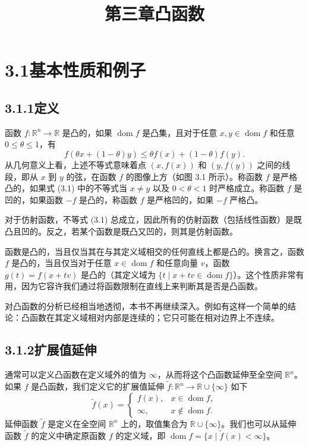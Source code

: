 \documentclass[UTF8,12pt,a4paper,fontset=fandol]{ctexart}
\title{第三章\quad 凸函数}
\author{}
\date{}
\DeclareMathOperator{\dom}{dom}
\begin{document}
\maketitle

\section*{3.1\quad 基本性质和例子}

\subsection*{3.1.1\quad 定义}

函数 $f:\mathbb{R}^n\to\mathbb{R}$ 是凸的，如果 $\dom f$ 是凸集，且对于任意 $x,y\in\dom f$ 和任意 $0\leq\theta\leq 1$，有
\begin{equation}
f(\theta x+(1-\theta)y)\leq \theta f(x)+(1-\theta)f(y).
\tag{3.1}
\end{equation}
从几何意义上看，上述不等式意味着点 $(x,f(x))$ 和 $(y,f(y))$ 之间的线段，即从 $x$ 到 $y$ 的弦，在函数 $f$ 的图像上方（如图 3.1 所示）。称函数 $f$ 是严格凸的，如果式 (3.1) 中的不等式当 $x\neq y$ 以及 $0<\theta<1$ 时严格成立。称函数 $f$ 是凹的，如果函数 $-f$ 是凸的，称函数 $f$ 是严格凹的，如果 $-f$ 严格凸。

对于仿射函数，不等式 (3.1) 总成立，因此所有的仿射函数（包括线性函数）是既凸且凹的。反之，若某个函数是既凸又凹的，则其是仿射函数。

函数是凸的，当且仅当其在与其定义域相交的任何直线上都是凸的。换言之，函数 $f$ 是凸的，当且仅当对于任意 $x\in\dom f$ 和任意向量 $v$，函数 $g(t)=f(x+tv)$ 是凸的（其定义域为 $\{t\mid x+tv\in\dom f\}$）。这个性质非常有用，因为它容许我们通过将函数限制在直线上来判断其是否是凸函数。

对凸函数的分析已经相当地透彻，本书不再继续深入。例如有这样一个简单的结论：凸函数在其定义域相对内部是连续的；它只可能在相对边界上不连续。

\subsection*{3.1.2\quad 扩展值延伸}

通常可以定义凸函数在定义域外的值为 $\infty$，从而将这个凸函数延伸至全空间 $\mathbb{R}^n$。如果 $f$ 是凸函数，我们定义它的扩展值延伸 $\tilde f:\mathbb{R}^n\to\mathbb{R}\cup\{\infty\}$ 如下
\[
\tilde f(x)=
\begin{cases}
f(x), & x\in\dom f,\\
\infty, & x\notin\dom f.
\end{cases}
\]
延伸函数 $\tilde f$ 是定义在全空间 $\mathbb{R}^n$ 上的，取值集合为 $\mathbb{R}\cup\{\infty\}$。我们也可以从延伸函数 $\tilde f$ 的定义中确定原函数 $f$ 的定义域，即 $\dom f=\{x\mid \tilde f(x)<\infty\}$。
\end{document}
